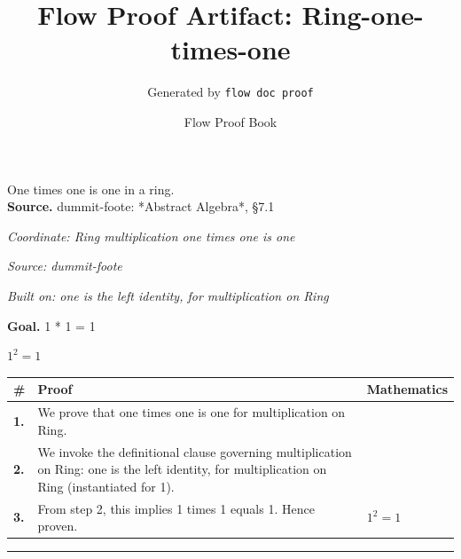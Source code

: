\documentclass[11pt]{article}
\title{Flow Proof Artifact: Ring-one-times-one}
\author{Generated by \texttt{flow doc proof}}
\date{Flow Proof Book}
\theoremstyle{definition}
\begin{document}
\maketitle
One times one is one in a ring.\\[0.5em]
\textbf{Source.} dummit-foote: *Abstract Algebra*, §7.1\\[0.5em]
\bigskip
{}\par
\smallskip\noindent\textit{Coordinate: Ring \cdot multiplication \cdot one times one is one}\par
\smallskip\noindent\textit{Source: dummit-foote}\par
\smallskip\noindent\textit{Built on: one is the left identity, for multiplication on Ring}\par
\medskip
\noindent\textbf{Goal.} 1 * 1 = 1\par
\noindent$\displaystyle 1^{2} = 1$\par
\medskip
\noindent
\begin{tabular}{@{} >{\raggedright\arraybackslash}p{} >{\raggedright\arraybackslash}p{} >{\raggedleft\arraybackslash}p{} @{}}
\textbf{\#} & \textbf{Proof} & \textbf{Mathematics} \\
\midrule
\textbf{1.} & We prove that one times one is one for multiplication on Ring. & \\[0.45em]
\textbf{2.} & We invoke the definitional clause governing multiplication on Ring: one is the left identity, for multiplication on Ring (instantiated for 1). & \\[0.45em]
\textbf{3.} & From step 2, this implies 1 times 1 equals 1. Hence proven. & $\displaystyle 1^{2} = 1$ \\[0.45em]
\bottomrule
\end{tabular}
\label{thm:Ring-multiplication-one_times_one_is_one}
\par\medskip\hrule
\end{document}
